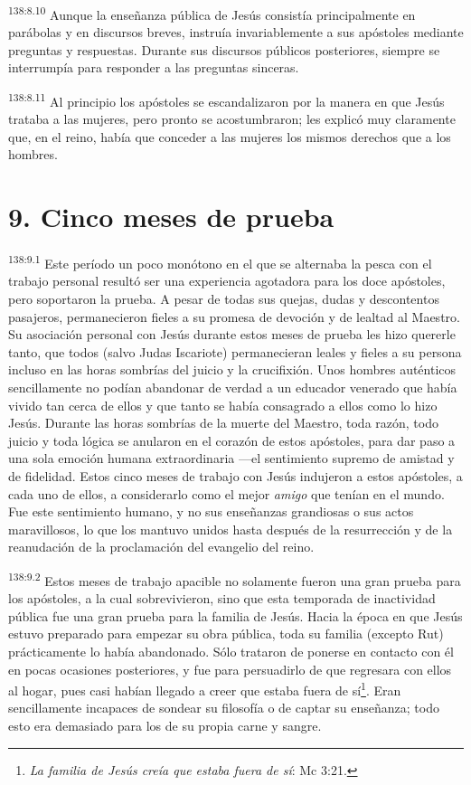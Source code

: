\par
\textsuperscript{138:8.10} Aunque la enseñanza pública de Jesús consistía principalmente en parábolas y en discursos breves, instruía invariablemente a sus apóstoles mediante preguntas y respuestas. Durante sus discursos públicos posteriores, siempre se interrumpía para responder a las preguntas sinceras.

\par
\textsuperscript{138:8.11} Al principio los apóstoles se escandalizaron por la manera en que Jesús trataba a las mujeres, pero pronto se acostumbraron; les explicó muy claramente que, en el reino, había que conceder a las mujeres los mismos derechos que a los hombres.

\section*{9. Cinco meses de prueba}
\par
\textsuperscript{138:9.1} Este período un poco monótono en el que se alternaba la pesca con el trabajo personal resultó ser una experiencia agotadora para los doce apóstoles, pero soportaron la prueba. A pesar de todas sus quejas, dudas y descontentos pasajeros, permanecieron fieles a su promesa de devoción y de lealtad al Maestro. Su asociación personal con Jesús durante estos meses de prueba les hizo quererle tanto, que todos (salvo Judas Iscariote) permanecieran leales y fieles a su persona incluso en las horas sombrías del juicio y la crucifixión. Unos hombres auténticos sencillamente no podían abandonar de verdad a un educador venerado que había vivido tan cerca de ellos y que tanto se había consagrado a ellos como lo hizo Jesús. Durante las horas sombrías de la muerte del Maestro, toda razón, todo juicio y toda lógica se anularon en el corazón de estos apóstoles, para dar paso a una sola emoción humana extraordinaria ---el sentimiento supremo de amistad y de fidelidad. Estos cinco meses de trabajo con Jesús indujeron a estos apóstoles, a cada uno de ellos, a considerarlo como el mejor \textit{amigo} que tenían en el mundo. Fue este sentimiento humano, y no sus enseñanzas grandiosas o sus actos maravillosos, lo que los mantuvo unidos hasta después de la resurrección y de la reanudación de la proclamación del evangelio del reino.

\par
\textsuperscript{138:9.2} Estos meses de trabajo apacible no solamente fueron una gran prueba para los apóstoles, a la cual sobrevivieron, sino que esta temporada de inactividad pública fue una gran prueba para la familia de Jesús. Hacia la época en que Jesús estuvo preparado para empezar su obra pública, toda su familia (excepto Rut) prácticamente lo había abandonado. Sólo trataron de ponerse en contacto con él en pocas ocasiones posteriores, y fue para persuadirlo de que regresara con ellos al hogar, pues casi habían llegado a creer que estaba fuera de sí\footnote{\textit{La familia de Jesús creía que estaba fuera de sí}: Mc 3:21.}. Eran sencillamente incapaces de sondear su filosofía o de captar su enseñanza; todo esto era demasiado para los de su propia carne y sangre.

